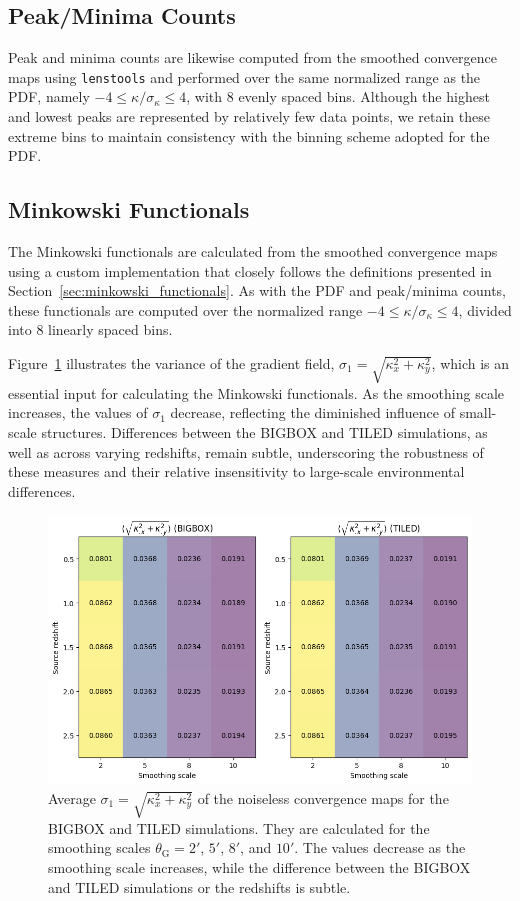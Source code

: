 \subsection{Peak/Minima Counts}
Peak and minima counts are likewise computed from the smoothed convergence maps using \texttt{lenstools} and performed over the same normalized range as the PDF, namely $-4 \leq \kappa/\sigma_{\kappa} \leq 4$, with 8 evenly spaced bins. Although the highest and lowest peaks are represented by relatively few data points, we retain these extreme bins to maintain consistency with the binning scheme adopted for the PDF.

\subsection{Minkowski Functionals}
The Minkowski functionals are calculated from the smoothed convergence maps using a custom implementation that closely follows the definitions presented in Section~\ref{sec:minkowski_functionals}. As with the PDF and peak/minima counts, these functionals are computed over the normalized range $-4 \leq \kappa/\sigma_{\kappa} \leq 4$, divided into 8 linearly spaced bins. 

Figure~\ref{fig:avg_sigma1} illustrates the variance of the gradient field, $\sigma_1 = \sqrt{\kappa_x^2 + \kappa_y^2}$, which is an essential input for calculating the Minkowski functionals. As the smoothing scale increases, the values of $\sigma_1$ decrease, reflecting the diminished influence of small-scale structures. Differences between the BIGBOX and TILED simulations, as well as across varying redshifts, remain subtle, underscoring the robustness of these measures and their relative insensitivity to large-scale environmental differences.

\begin{figure}[ht]
    \centering
    \includegraphics[width=\textwidth]{figures/avg_sigma1.png}
    \caption[Average $\sigma_1 = \sqrt{\kappa_{x}^2 + \kappa_{y}^2}$ of the noiseless convergence maps]{Average $\sigma_1 = \sqrt{\kappa_{x}^2 + \kappa_{y}^2}$ of the noiseless convergence maps for the BIGBOX and TILED simulations. They are calculated for the smoothing scales $\theta_{\mathrm{G}} = 2'$, $5'$, $8'$, and $10'$. The values decrease as the smoothing scale increases, while the difference between the BIGBOX and TILED simulations or the redshifts is subtle.
    } \label{fig:avg_sigma1}
\end{figure}


